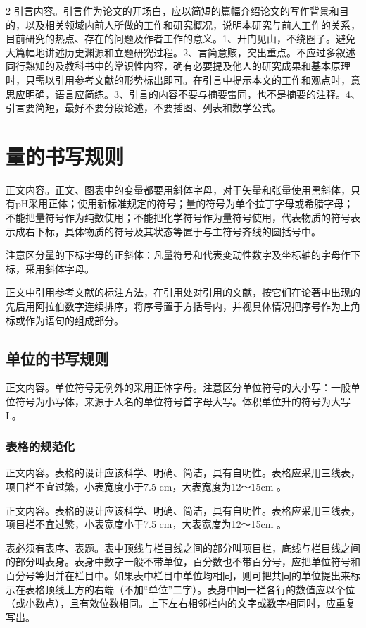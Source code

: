 \documentclass{whureport}
\begin{document}
\begin{multicols}{2}
	引言内容。引言作为论文的开场白，应以简短的篇幅介绍论文的写作背景和目的，以及相关领域内前人所做的工作和研究概况，说明本研究与前人工作的关系，目前研究的热点、存在的问题及作者工作的意义。1、开门见山，不绕圈子。避免大篇幅地讲述历史渊源和立题研究过程。2、言简意赅，突出重点。不应过多叙述同行熟知的及教科书中的常识性内容，确有必要提及他人的研究成果和基本原理时，只需以引用参考文献的形势标出即可。在引言中提示本文的工作和观点时，意思应明确，语言应简练。3、引言的内容不要与摘要雷同，也不是摘要的注释。4、引言要简短，最好不要分段论述，不要插图、列表和数学公式。
	\section{量的书写规则}
	正文内容。正文、图表中的变量都要用斜体字母，对于矢量和张量使用黑斜体，只有pH采用正体；使用新标准规定的符号；量的符号为单个拉丁字母或希腊字母；不能把量符号作为纯数使用；不能把化学符号作为量符号使用，代表物质的符号表示成右下标，具体物质的符号及其状态等置于与主符号齐线的圆括号中\cite{snowflakes}。
	
	注意区分量的下标字母的正斜体：凡量符号和代表变动性数字及坐标轴的字母作下标，采用斜体字母。
	
	正文中引用参考文献的标注方法，在引用处对引用的文献，按它们在论著中出现的先后用阿拉伯数字连续排序，将序号置于方括号内，并视具体情况把序号作为上角标或作为语句的组成部分。
	\subsection{单位的书写规则}
	正文内容。单位符号无例外的采用正体字母\cite{jupyter}。注意区分单位符号的大小写：一般单位符号为小写体，来源于人名的单位符号首字母大写。体积单位升的符号为大写L。
	\subsubsection{表格的规范化}
	正文内容。表格的设计应该科学、明确、简洁，具有自明性。表格应采用三线表，项目栏不宜过繁，小表宽度小于7.5 cm，大表宽度为12～15cm 。
	
	正文内容。表格的设计应该科学、明确、简洁，具有自明性。表格应采用三线表，项目栏不宜过繁，小表宽度小于7.5 cm，大表宽度为12～15cm 。
	
	表必须有表序、表题。表中顶线与栏目线之间的部分叫项目栏，底线与栏目线之间的部分叫表身\cite{notebook}。表身中数字一般不带单位，百分数也不带百分号，应把单位符号和百分号等归并在栏目中。如果表中栏目中单位均相同，则可把共同的单位提出来标示在表格顶线上方的右端（不加“单位”二字）。表身中同一栏各行的数值应以个位（或小数点），且有效位数相同。上下左右相邻栏内的文字或数字相同时，应重复写出。
	

\end{multicols}
\end{document}
